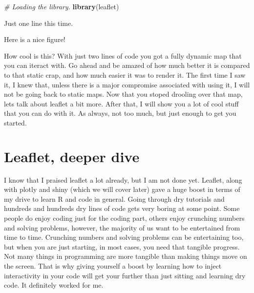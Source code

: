\documentclass[]{book}
\newenvironment{Shaded}{\begin{snugshade}}{\end{snugshade}}
\newcommand{\CommentTok}[1]{\textcolor[rgb]{0.56,0.35,0.01}{\textit{#1}}}
\newcommand{\KeywordTok}[1]{\textcolor[rgb]{0.13,0.29,0.53}{\textbf{#1}}}
\newcommand{\NormalTok}[1]{#1}
\newcommand{\OperatorTok}[1]{\textcolor[rgb]{0.81,0.36,0.00}{\textbf{#1}}}
\newcommand{\StringTok}[1]{\textcolor[rgb]{0.31,0.60,0.02}{#1}}
\begin{document}
\begin{Shaded}
\begin{Highlighting}[]
\CommentTok{# Loading the library.}
  \KeywordTok{library}\NormalTok{(leaflet)}
\end{Highlighting}
\end{Shaded}

Just one line this time.

\begin{Shaded}
\end{Shaded}

\hypertarget{htmlwidget-62f2cfa9836887bc9ab5}{}

\label{fig:nice-fig72}Here is a nice figure!

How cool is this? With just two lines of code you got a fully dynamic map that you can iteract with. Go ahead and be amazed of how much better it is compared to that static crap, and how much easier it was to render it. The first time I saw it, I knew that, unless there is a major compromise associated with using it, I will not be going back to static maps. Now that you stoped drooling over that map, lets talk about leaflet a bit more. After that, I will show you a lot of cool stuff that you can do with it. As always, not too much, but just enough to get you started.

\hypertarget{leaflet-deeper-dive}{%
\section{Leaflet, deeper dive}\label{leaflet-deeper-dive}}

I know that I praised leaflet a lot already, but I am not done yet. Leaflet, along with plotly and shiny (which we will cover later) gave a huge boost in terms of my drive to learn R and code in general. Going through dry tutorials and hundreds and hundreds dry lines of code gets very boring at some point. Some people do enjoy coding just for the coding part, others enjoy crunching numbers and solving problems, however, the majority of us want to be entertained from time to time. Crunching numbers and solving problems can be entertaining too, but when you are just starting, in most cases, you need that tangible progress. Not many things in programming are more tangible than making things move on the screen. That is why giving yourself a boost by learning how to inject interactivity in your code will get your further than just sitting and learning dry code. It definitely worked for me.
\end{document}
